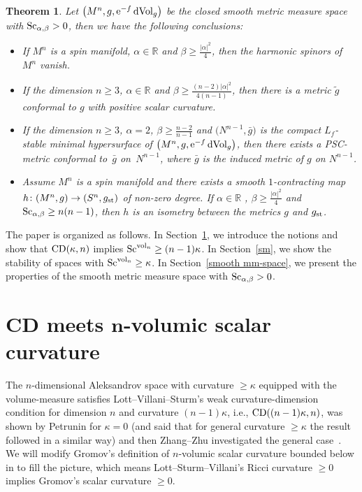 \documentclass[10pt,a4paper]{amsart}
\newtheorem{Theorem}{Theorem}[section]
\begin{document}
\begin{Theorem}
 Let $\big(M^n, g, {\rm e}^{-f}\,{\rm dVol}_g\big)$ be the closed smooth metric measure space with ${\rm Sc}_{\alpha, \beta}>0$, then we have the following conclusions:
 \begin{itemize}\itemsep=0pt
 \item[$1.$] If $M^n$ is a spin manifold, $\alpha \in \mathbb{R}$ and $\beta \geq \frac{|\alpha|^2}{4}$, then the harmonic spinors of $M^n$ vanish.
 \item[$2.$] If the dimension $n\geq 3$, $\alpha \in \mathbb{R}$ and $\beta \geq \frac{(n-2)|\alpha|^2}{4(n-1)}$, then there is a metric $\tilde{g}$ conformal to $g$ with positive scalar curvature.
 \item[$3.$] If the dimension $n\geq 3$, $\alpha=2$, $\beta \geq \frac{n-2}{n-1}$ and $\big(N^{n-1},\bar{g}\big)$ is the compact $L_f$-stable minimal hypersurface of $\big(M^n, g, {\rm e}^{-f}\,{\rm dVol}_g\big)$, then there exists a PSC-metric conformal to~$\bar{g}$ on~$N^{n-1}$, where $\bar{g}$ is the induced metric of $g$ on $N^{n-1}$.

 \item[$4.$] Assume $M^n$ is a spin manifold and there exists a smooth $1$-contracting map $h\colon (M^n, g)\to (S^n, g_{\rm st})$ of non-zero degree. If $\alpha \in \mathbb{R}$ , $\beta \geq \frac{|\alpha|^2}{4}$ and ${\rm Sc}_{\alpha, \beta}\geq n(n-1)$, then $h$ is an isometry between the metrics $g$ and $g_{\rm st}$.
\end{itemize}
\end{Theorem}

The paper is organized as follows. In Section~\ref{CD}, we introduce the notions and show that ${\rm CD}(\kappa,n)$ implies ${\rm Sc}^{{\rm vol}_n}\geq (n-1)\kappa$. In Section~\ref{sm}, we show the stability of spaces with ${\rm Sc}^{{\rm vol}_n}\geq\kappa$. In Section~\ref{smooth mm-space}, we present the properties of the smooth metric measure space with ${\rm Sc}_{\alpha, \beta}>0$.

\section[CD meets n-volumic scalar curvature]{CD meets $\boldsymbol{n}$-volumic scalar curvature}\label{CD}
 The $n$-dimensional Aleksandrov space with curvature $\geq\kappa$ equipped with the volume-measure satisfies Lott--Villani--Sturm's weak curvature-dimension condition for dimension $n$ and curvature $(n-1) \kappa$, i.e., ${\rm CD}((n-1)\kappa, n)$, was shown by Petrunin for $\kappa=0$ (and said that for general curvature $\geq\kappa$ the result followed in a similar way) \cite{MR2869253} and then Zhang--Zhu investigated the general case~\cite{MR2747437}. We will modify Gromov's definition of $n$-volumic scalar curvature bounded below in \cite[Section~26]{Gromov} to fill the picture, which means Lott--Sturm--Villani's Ricci curvature $\geq 0$ implies Gromov's scalar curvature $\geq 0$.
\end{document}
